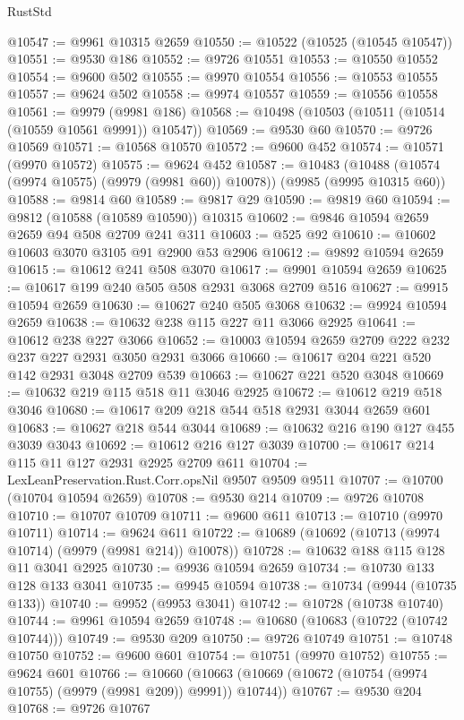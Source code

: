 \begin{lexlean}{RustStd}
\begin{coremodule}
@10547 := @9961 @10315 @2659
@10550 := @10522 (@10525 (@10545 @10547))
@10551 := @9530 @186
@10552 := @9726 @10551
@10553 := @10550 @10552
@10554 := @9600 @502
@10555 := @9970 @10554
@10556 := @10553 @10555
@10557 := @9624 @502
@10558 := @9974 @10557
@10559 := @10556 @10558
@10561 := @9979 (@9981 @186)
@10568 := @10498 (@10503 (@10511 (@10514 (@10559 @10561 @9991)) @10547))
@10569 := @9530 @60
@10570 := @9726 @10569
@10571 := @10568 @10570
@10572 := @9600 @452
@10574 := @10571 (@9970 @10572)
@10575 := @9624 @452
@10587 := @10483
    (@10488 (@10574 (@9974 @10575) (@9979 (@9981 @60)) @10078))
    (@9985 (@9995 @10315 @60))
@10588 := @9814 @60
@10589 := @9817 @29
@10590 := @9819 @60
@10594 := @9812 (@10588 (@10589 @10590)) @10315
@10602 := @9846 @10594 @2659 @2659 @94 @508 @2709 @241 @311
@10603 := @525 @92
@10610 := @10602 @10603 @3070 @3105 @91 @2900 @53 @2906
@10612 := @9892 @10594 @2659
@10615 := @10612 @241 @508 @3070
@10617 := @9901 @10594 @2659
@10625 := @10617 @199 @240 @505 @508 @2931 @3068 @2709 @516
@10627 := @9915 @10594 @2659
@10630 := @10627 @240 @505 @3068
@10632 := @9924 @10594 @2659
@10638 := @10632 @238 @115 @227 @11 @3066 @2925
@10641 := @10612 @238 @227 @3066
@10652 := @10003 @10594 @2659 @2709 @222 @232 @237 @227 @2931 @3050 @2931 @3066
@10660 := @10617 @204 @221 @520 @142 @2931 @3048 @2709 @539
@10663 := @10627 @221 @520 @3048
@10669 := @10632 @219 @115 @518 @11 @3046 @2925
@10672 := @10612 @219 @518 @3046
@10680 := @10617 @209 @218 @544 @518 @2931 @3044 @2659 @601
@10683 := @10627 @218 @544 @3044
@10689 := @10632 @216 @190 @127 @455 @3039 @3043
@10692 := @10612 @216 @127 @3039
@10700 := @10617 @214 @115 @11 @127 @2931 @2925 @2709 @611
@10704 := LexLeanPreservation.Rust.Corr.opsNil @9507 @9509 @9511
@10707 := @10700 (@10704 @10594 @2659)
@10708 := @9530 @214
@10709 := @9726 @10708
@10710 := @10707 @10709
@10711 := @9600 @611
@10713 := @10710 (@9970 @10711)
@10714 := @9624 @611
@10722 := @10689 (@10692 (@10713 (@9974 @10714) (@9979 (@9981 @214)) @10078))
@10728 := @10632 @188 @115 @128 @11 @3041 @2925
@10730 := @9936 @10594 @2659
@10734 := @10730 @133 @128 @133 @3041
@10735 := @9945 @10594
@10738 := @10734 (@9944 (@10735 @133))
@10740 := @9952 (@9953 @3041)
@10742 := @10728 (@10738 @10740)
@10744 := @9961 @10594 @2659
@10748 := @10680 (@10683 (@10722 (@10742 @10744)))
@10749 := @9530 @209
@10750 := @9726 @10749
@10751 := @10748 @10750
@10752 := @9600 @601
@10754 := @10751 (@9970 @10752)
@10755 := @9624 @601
@10766 := @10660
    (@10663 (@10669 (@10672 (@10754 (@9974 @10755) (@9979 (@9981 @209)) @9991)) @10744))
@10767 := @9530 @204
@10768 := @9726 @10767

\end{coremodule}
\end{lexlean}
